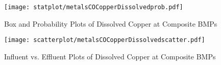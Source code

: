         \begin{figure}[hb]   %
            \centering
            \texttt{[image: statplot/metalsCOCopperDissolvedprob.pdf]}
            \caption{Box and Probability Plots of Dissolved Copper at Composite BMPs}
        \end{figure}         %
        
        
        \begin{figure}[hb]   %
            \centering
            \texttt{[image: scatterplot/metalsCOCopperDissolvedscatter.pdf]}
            \caption{Influent vs. Effluent Plots of Dissolved Copper at Composite BMPs}
        \end{figure}         %
        \clearpage
        